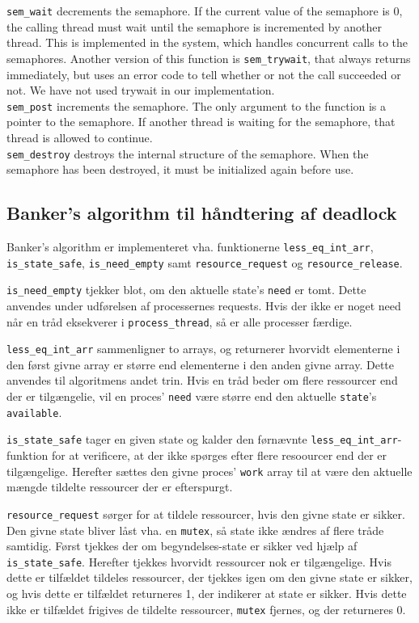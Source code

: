 \texttt{sem\_wait} decrements the semaphore. If the current value of the semaphore is 0, the calling thread must wait until the semaphore is incremented by another thread. This is implemented in the system, which handles concurrent calls to the semaphores. Another version of this function is \texttt{sem\_trywait}, that always returns immediately, but uses an error code to tell whether or not the call succeeded or not. We have not used trywait in our implementation.\\

\texttt{sem\_post} increments the semaphore. The only argument to the function is a pointer to the semaphore. If another thread is waiting for the semaphore, that thread is allowed to continue.\\

\texttt{sem\_destroy} destroys the internal structure of the semaphore. When the semaphore has been destroyed, it must be initialized again before use.

\subsection{Banker's algorithm til håndtering af deadlock}
Banker's algorithm er implementeret vha. funktionerne \texttt{less\_eq\_int\_arr}, \texttt{is\_state\_safe}, \texttt{is\_need\_empty} samt \texttt{resource\_request} og \texttt{resource\_release}. 

\texttt{is\_need\_empty} tjekker blot, om den aktuelle state's \texttt{need} er tomt. Dette anvendes under udførelsen af processernes requests. Hvis der ikke er noget need når en tråd eksekverer i \texttt{process\_thread}, så er alle processer færdige.   

\texttt{less\_eq\_int\_arr} sammenligner to arrays, og returnerer hvorvidt elementerne i den først givne array er større end elementerne i den anden givne array. Dette anvendes til algoritmens andet trin. Hvis en tråd beder om flere ressourcer end der er tilgængelie, vil en proces' \texttt{need} være større end den aktuelle \texttt{state}'s \texttt{available}.

\texttt{is\_state\_safe} tager en given state og kalder den førnævnte \texttt{less\_eq\_int\_arr}-funktion for at verificere, at der ikke spørges efter flere resoourcer end der er tilgængelige. Herefter sættes den givne proces' \texttt{work} array til at være den aktuelle mængde tildelte ressourcer der er efterspurgt. 

\texttt{resource\_request} sørger for at tildele ressourcer, hvis den givne state er sikker. Den givne state bliver låst vha. en \texttt{mutex}, så state ikke ændres af flere tråde samtidig.  
Først tjekkes der om begyndelses-state er sikker ved hjælp af \texttt{is\_state\_safe}. Herefter tjekkes hvorvidt ressourcer nok er tilgængelige. Hvis dette er tilfældet tildeles ressourcer, der tjekkes igen om den givne state er sikker, og hvis dette er tilfældet returneres 1, der indikerer at state er sikker. Hvis dette ikke er tilfældet frigives de tildelte ressourcer, \texttt{mutex} fjernes, og der returneres 0.

